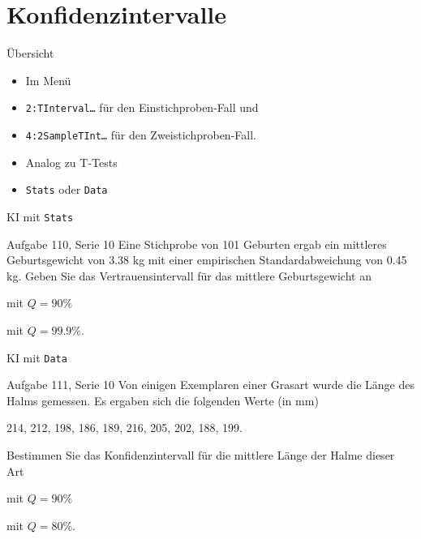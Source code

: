 \documentclass{beamer}
\newlength{\tikey}
\newcommand{\keystroke}[1]{\settowidth{\tikey}{\scriptsize #1}\psframebox[framearc=0.2]{\parbox{\tikey}{\scriptsize #1}}}
\begin{document}
\section{Konfidenzintervalle}
\begin{frame}{Übersicht}
\begin{itemize}
\item Im Menü \keystroke{F7}
\item \texttt{2:TInterval\ldots} für den Einstichproben-Fall und
\item \texttt{4:2SampleTInt\ldots} für den Zweistichproben-Fall.
\item Analog zu T-Tests
\item \texttt{Stats} oder \texttt{Data}
\end{itemize}
\end{frame}

\begin{frame}{KI mit \texttt{Stats}}
\begin{beamerboxesrounded}[shadow]{Aufgabe 110, Serie 10}
Eine Stichprobe von 101 Geburten ergab ein mittleres Geburtsgewicht von 3.38 kg mit
einer empirischen Standardabweichung von 0.45 kg. Geben Sie das Vertrauensintervall für
das mittlere Geburtsgewicht an 
\begin{outline}
\item mit $Q = 90\%$
\item mit $Q = 99.9\%$.
\end{outline}
\end{beamerboxesrounded}
\end{frame}

\begin{frame}{KI mit \texttt{Data}}
\begin{beamerboxesrounded}[shadow]{Aufgabe 111, Serie 10}
Von einigen Exemplaren einer Grasart wurde die Länge des Halms gemessen. Es ergaben
sich die folgenden Werte (in mm)
\begin{center}
214, 212, 198, 186, 189, 216, 205, 202, 188, 199.
\end{center}

Bestimmen Sie das Konfidenzintervall für die mittlere Länge der Halme dieser Art 
\begin{outline}
\item mit $Q = 90\%$
\item mit $Q = 80\%$.
\end{outline}
\end{beamerboxesrounded}
\end{frame}
\end{document}
